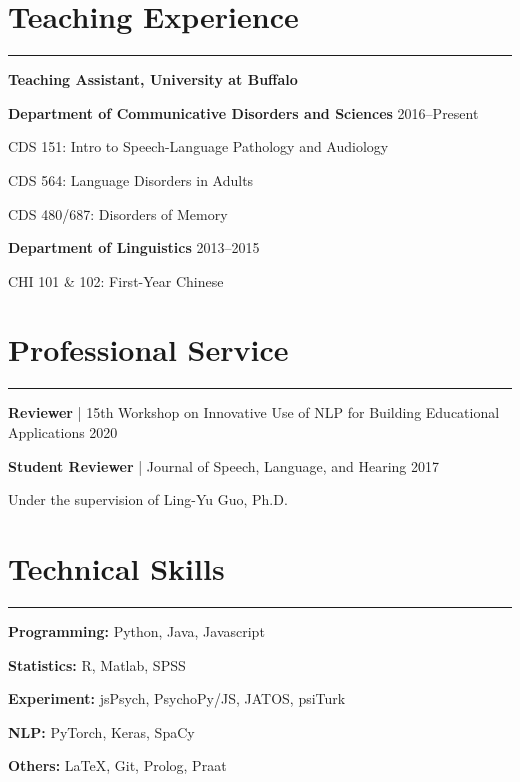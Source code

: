 \documentclass[11pt]{article}
\newcommand{\cvsection}[1]{\vspace{-0.2cm}\section*{\Large #1}\vspace{-0.2cm}\hrule\vspace{0.2cm}}
\begin{document}
\cvsection{Teaching Experience}

\textbf{Teaching Assistant, University at Buffalo}

\textbf{Department of Communicative Disorders and Sciences} \hfill 2016--Present

\quad CDS 151: Intro to Speech-Language Pathology and Audiology

\quad CDS 564: Language Disorders in Adults

\quad CDS 480/687: Disorders of Memory

\textbf{Department of Linguistics} \hfill 2013--2015

\quad CHI 101 \& 102: First-Year Chinese


\cvsection{Professional Service}

\textbf{Reviewer} | 15th Workshop on Innovative Use of NLP for Building Educational Applications \hfill 2020

\textbf{Student Reviewer} | Journal of Speech, Language, and Hearing \hfill 2017

\quad Under the supervision of Ling-Yu Guo, Ph.D.

\cvsection{Technical Skills}

\textbf{Programming:} Python, Java, Javascript

\textbf{Statistics:} R, Matlab, SPSS

\textbf{Experiment:} jsPsych, PsychoPy/JS, JATOS, psiTurk

\textbf{NLP:} PyTorch, Keras, SpaCy

\textbf{Others:} \LaTeX, Git, Prolog, Praat





\end{document}
